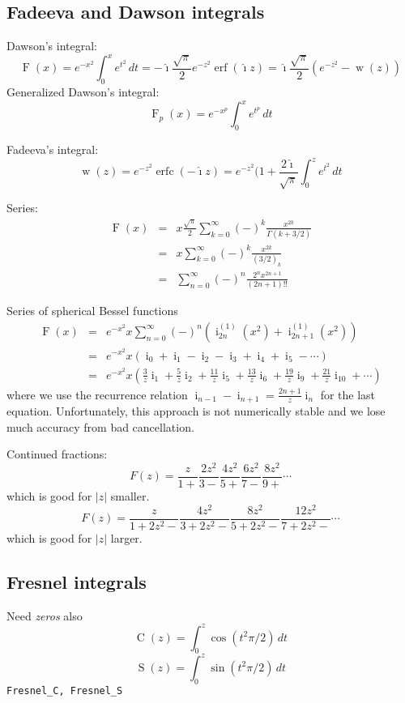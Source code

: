 \documentclass[10pt,dvipdfmx,letterpaper,twoside]{article}
\DeclareMathOperator{\erf}{erf}
\DeclareMathOperator{\erfc}{erfc}
\let\O=\operatorname
\newcommand{\ii}{{\hat{\imath}}}
\let\Gam=\Gamma
\begin{document}
\subsection{Fadeeva and Dawson integrals}
Dawson's integral:
\[ \O{F}(x) = e^{-x^2}\int_0^x e^{t^2}\,dt = -\ii\frac{\sqrt\pi}{2}e^{-z^2}\erf(\ii z) = \ii\frac{\sqrt{\pi}}{2}\left(e^{-z^2} -\O{w}(z)\right)\]
Generalized Dawson's integral:
\[ \O{F}_p(x) = e^{-x^p}\int_0^x e^{t^p}\,dt \]

Fadeeva's integral:
\[ \O{w}(z) = e^{-z^2}\erfc(-\ii z) = e^{-z^2}(1 + \frac{2\ii}{\sqrt\pi}\int_0^z e^{t^2}\,dt \]

Series:
\begin{eqnarray*}
\O{F}(x) &=& x\frac{\sqrt{\pi}}{2}\sum_{k=0}^\infty(-)^k\frac{x^{2k}}{\Gam(k+3/2)} \\
         &=& x\sum_{k=0}^\infty (-)^k \frac{x^{2k}}{(3/2)_k} \\
         &=& \sum_{n=0}^\infty (-)^n \frac{2^n x^{2n+1}}{(2n+1)!!}
\end{eqnarray*}

Series of spherical Bessel functions
\begin{eqnarray*}
\O{F}(x) &=& e^{-x^2} x \sum_{n=0}^\infty (-)^n \left( \O{i}^{(1)}_{2n}(x^2) + \O{i}^{(1)}_{2n+1}(x^2) \right) \\
         &=& e^{-x^2} x \left( \O{i}_0 + \O{i}_1 - \O{i}_2 - \O{i}_3 + \O{i}_4 + \O{i}_5 - \cdots \right) \\
         &=& e^{-x^2} x \left( \frac{3}{z}\O{i}_1 + \frac{5}{z}\O{i}_2 + \frac{11}{z}\O{i}_5 + \frac{13}{z}\O{i}_6 + \frac{19}{z}\O{i}_9 + \frac{21}{z}\O{i}_{10} + \cdots \right)
\end{eqnarray*}
where we use the recurrence relation $\O{i}_{n-1} - \O{i}_{n+1} = \tfrac{2n+1}{z}\O{i}_n$ for the last equation.
Unfortunately, this approach is not numerically stable and we lose much accuracy from bad cancellation.

Continued fractions:
\[ F(z) = \frac{z}{1+} \frac{2z^2}{3-} \frac{4z^2}{5+} \frac{6z^2}{7-} \frac{8z^2}{9+} \cdots \]
which is good for $|z|$ smaller.
\[ F(z) = \frac{z}{1+2z^2-} \frac{4z^2}{3+2z^2-} \frac{8z^2}{5+2z^2-} \frac{12z^2}{7+2z^2-} \cdots \]
which is good for $|z|$ larger.


\subsection{Fresnel integrals}
Need {\em zeros} also
\[ \O{C}(z) = \int_0^z \cos(t^2 \pi/2)\,dt \]
\[ \O{S}(z) = \int_0^z \sin(t^2 \pi/2)\,dt \]
{\tt Fresnel\_C, Fresnel\_S}
\end{document}
